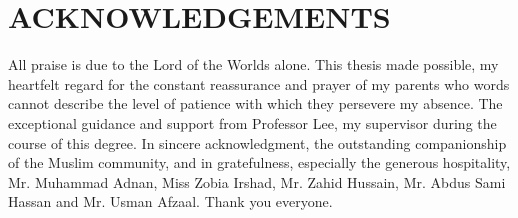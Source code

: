 
\section*{ACKNOWLEDGEMENTS}

All praise is due to the Lord of the Worlds alone. This thesis made possible, my heartfelt regard for the constant reassurance and prayer of my parents who words cannot describe the level of patience with which they persevere my absence. The exceptional guidance and support from Professor Lee, my supervisor during the course of this degree. In sincere acknowledgment, the outstanding companionship of the Muslim community, and in gratefulness, especially the generous hospitality, Mr. Muhammad Adnan, Miss Zobia Irshad, Mr. Zahid Hussain, Mr. Abdus Sami Hassan and Mr. Usman Afzaal. Thank you everyone.


\pagebreak
